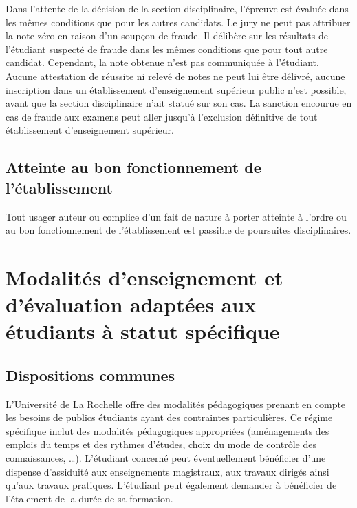 \documentclass[a4paper,11pt]{article}
\begin{document}
Dans l'attente de la décision de la section disciplinaire, l'épreuve est évaluée dans les mêmes conditions que pour les autres candidats. Le jury ne peut pas attribuer la note zéro en raison d'un soupçon de fraude. Il délibère sur les résultats de l'étudiant suspecté de fraude dans les mêmes conditions que pour tout autre candidat. Cependant, la note obtenue n'est pas communiquée à l'étudiant. Aucune attestation de réussite ni relevé de notes ne peut lui être délivré, aucune inscription dans un établissement d'enseignement supérieur public n'est possible, avant que la section disciplinaire n'ait statué sur son cas.
La sanction encourue en cas de fraude aux examens peut aller jusqu'à l'exclusion définitive de tout établissement d'enseignement supérieur.


\subsection{Atteinte au bon fonctionnement de l'établissement}
Tout usager auteur ou complice d'un fait de nature à porter atteinte à l'ordre ou au bon fonctionnement de l'établissement est passible de poursuites disciplinaires.

\section{Modalités d'enseignement et d'évaluation adaptées aux étudiants à statut spécifique}\label{StatutSpe}
\subsection{Dispositions communes}\label{Communes}
L'Université de La Rochelle offre des modalités pédagogiques prenant en compte les besoins de publics étudiants ayant des contraintes particulières.
Ce régime spécifique inclut des modalités pédagogiques appropriées (aménagements des emplois du temps et des rythmes d'études, choix du mode de contrôle des connaissances, \ldots{}). L'étudiant concerné peut éventuellement bénéficier d'une dispense d'assiduité aux enseignements magistraux, aux travaux dirigés ainsi qu'aux travaux pratiques. L'étudiant peut également demander à bénéficier de l'étalement de la durée de sa formation.
\end{document}
